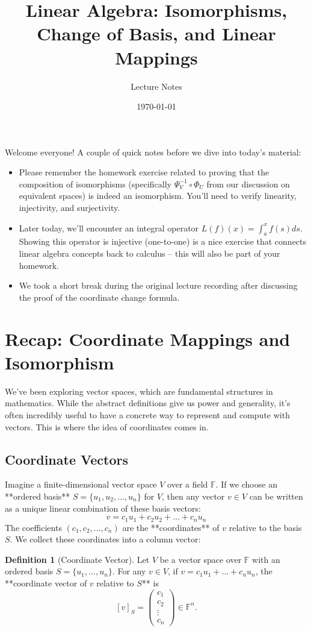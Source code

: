 \documentclass[11pt]{article}
\title{Linear Algebra: Isomorphisms, Change of Basis, and Linear Mappings}
\author{Lecture Notes} %
\date{\today} %
\theoremstyle{definition}
\newtheorem{definition}[theorem]{Definition}
\theoremstyle{remark}
\newcommand{\F}{\mathbb{F}}
\newcommand{\Fn}[1]{\F^{#1}}
\newcommand{\coord}[2]{[#1]_{#2}} %
\begin{document}
\maketitle

\begin{adminnote}
    Welcome everyone! A couple of quick notes before we dive into today's material:
    \begin{itemize}
        \item Please remember the homework exercise related to proving that the composition of isomorphisms (specifically $\Psi_V^{-1} \circ \Phi_U$ from our discussion on equivalent spaces) is indeed an isomorphism. You'll need to verify linearity, injectivity, and surjectivity.
        \item Later today, we'll encounter an integral operator $L(f)(x) = \int_a^x f(s) ds$. Showing this operator is injective (one-to-one) is a nice exercise that connects linear algebra concepts back to calculus – this will also be part of your homework.
        \item We took a short break during the original lecture recording after discussing the proof of the coordinate change formula.
    \end{itemize}
\end{adminnote}

\section{Recap: Coordinate Mappings and Isomorphism}

We've been exploring vector spaces, which are fundamental structures in mathematics. While the abstract definitions give us power and generality, it's often incredibly useful to have a concrete way to represent and compute with vectors. This is where the idea of coordinates comes in.

\subsection{Coordinate Vectors}

Imagine a finite-dimensional vector space $V$ over a field $\F$. If we choose an **ordered basis** $S = \{u_1, u_2, \dots, u_n\}$ for $V$, then any vector $v \in V$ can be written as a unique linear combination of these basis vectors:
\[ v = c_1 u_1 + c_2 u_2 + \dots + c_n u_n \]
The coefficients $(c_1, c_2, \dots, c_n)$ are the **coordinates** of $v$ relative to the basis $S$. We collect these coordinates into a column vector:
\begin{definition}[Coordinate Vector]
    Let $V$ be a vector space over $\F$ with an ordered basis $S = \{u_1, \dots, u_n\}$. For any $v \in V$, if $v = c_1 u_1 + \dots + c_n u_n$, the **coordinate vector of $v$ relative to $S$** is
    \[ \coord{v}{S} = \begin{pmatrix} c_1 \\ c_2 \\ \vdots \\ c_n \end{pmatrix} \in \Fn{n}. \]
\end{definition}
\end{document}
